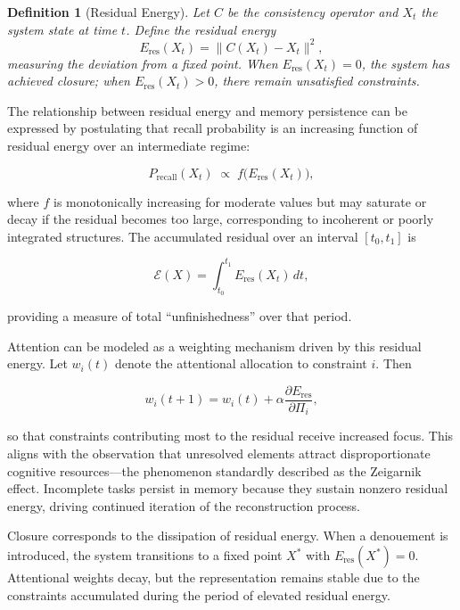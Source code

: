 \documentclass[12pt, letterpaper]{article}
\theoremstyle{flyxion}
\newtheorem{definition}{Definition}
\begin{document}
\begin{definition}[Residual Energy]
Let $C$ be the consistency operator and $X_t$ the system state at time $t$. Define the residual energy
\begin{equation}
E_\mathrm{res}(X_t) = \|C(X_t) - X_t\|^2,
\end{equation}
measuring the deviation from a fixed point. When $E_\mathrm{res}(X_t) = 0$, the system has achieved closure; when $E_\mathrm{res}(X_t) > 0$, there remain unsatisfied constraints.
\end{definition}

The relationship between residual energy and memory persistence can be expressed by postulating that recall probability is an increasing function of residual energy over an intermediate regime:

\begin{equation}
P_\mathrm{recall}(X_t) \;\propto\; f\bigl(E_\mathrm{res}(X_t)\bigr),
\end{equation}

where $f$ is monotonically increasing for moderate values but may saturate or decay if the residual becomes too large, corresponding to incoherent or poorly integrated structures. The accumulated residual over an interval $[t_0, t_1]$ is

\begin{equation}
\mathcal{E}(X) = \int_{t_0}^{t_1} E_\mathrm{res}(X_t)\, dt,
\end{equation}

providing a measure of total ``unfinishedness'' over that period.

Attention can be modeled as a weighting mechanism driven by this residual energy. Let $w_i(t)$ denote the attentional allocation to constraint $i$. Then

\begin{equation}
w_i(t+1) = w_i(t) + \alpha \frac{\partial E_\mathrm{res}}{\partial \Pi_i},
\end{equation}

so that constraints contributing most to the residual receive increased focus. This aligns with the observation that unresolved elements attract disproportionate cognitive resources---the phenomenon standardly described as the Zeigarnik effect. Incomplete tasks persist in memory because they sustain nonzero residual energy, driving continued iteration of the reconstruction process.

Closure corresponds to the dissipation of residual energy. When a denouement is introduced, the system transitions to a fixed point $X^*$ with $E_\mathrm{res}(X^*) = 0$. Attentional weights decay, but the representation remains stable due to the constraints accumulated during the period of elevated residual energy.
\end{document}
